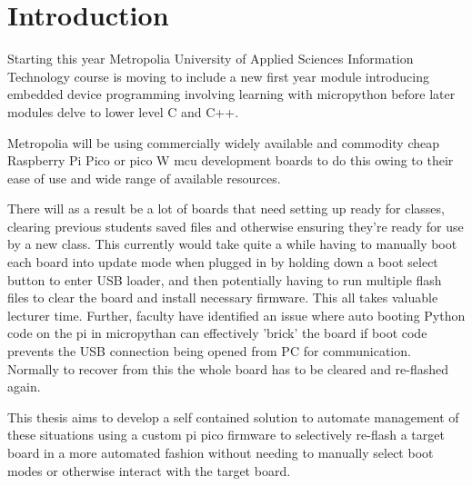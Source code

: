 
\chapter{Introduction}

Starting this year Metropolia University of Applied Sciences Information Technology course is moving to include a new first year module introducing embedded device programming involving learning with micropython before later modules delve to lower level C and C++.

Metropolia will be using commercially widely available and commodity cheap Raspberry Pi Pico or pico W \gls{mcu}  development boards to do this owing to their ease of use and wide range of available resources.

There will as a result be a lot of boards that need setting up ready for classes, clearing previous students saved files and otherwise ensuring they're ready for use by a new class. This currently would take quite a while having to manually boot each board into update mode when plugged in by holding down a boot select button to enter USB loader, and then potentially having to run multiple flash files to clear the board and install necessary firmware. This all takes valuable lecturer time. Further, faculty have identified an issue where auto booting Python code on the pi in micropythan can effectively 'brick' the board if boot code prevents the USB connection being opened from PC for communication. Normally to recover from this the whole board has to be cleared and re-flashed again.

This thesis aims to develop a self contained solution to automate management of these situations using a custom pi pico firmware to selectively re-flash a target board in a more automated fashion without needing to manually select boot modes or otherwise interact with the target board.
\pagebreak 